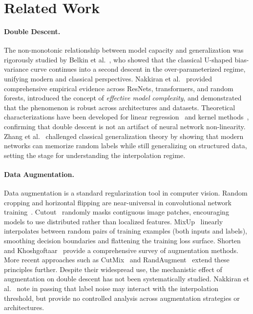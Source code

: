 \section{Related Work}

\paragraph{Double Descent.}
The non-monotonic relationship between model capacity and generalization was rigorously studied by Belkin et al.~\cite{belkin2019reconciling}, who showed that the classical U-shaped bias-variance curve continues into a second descent in the over-parameterized regime, unifying modern and classical perspectives. Nakkiran et al.~\cite{nakkiran2020deep} provided comprehensive empirical evidence across ResNets, transformers, and random forests, introduced the concept of \emph{effective model complexity}, and demonstrated that the phenomenon is robust across architectures and datasets. Theoretical characterizations have been developed for linear regression~\cite{bartlett2020benign} and kernel methods~\cite{mei2022generalization}, confirming that double descent is not an artifact of neural network non-linearity. Zhang et al.~\cite{zhang2017understanding} challenged classical generalization theory by showing that modern networks can memorize random labels while still generalizing on structured data, setting the stage for understanding the interpolation regime.

\paragraph{Data Augmentation.}
Data augmentation is a standard regularization tool in computer vision. Random cropping and horizontal flipping are near-universal in convolutional network training~\cite{he2016deep,krizhevsky2009learning}. Cutout~\cite{devries2017cutout} randomly masks contiguous image patches, encouraging models to use distributed rather than localized features. MixUp~\cite{zhang2018mixup} linearly interpolates between random pairs of training examples (both inputs and labels), smoothing decision boundaries and flattening the training loss surface. Shorten and Khoshgoftaar~\cite{shorten2019survey} provide a comprehensive survey of augmentation methods. More recent approaches such as CutMix~\cite{yun2019cutmix} and RandAugment~\cite{cubuk2020randaugment} extend these principles further. Despite their widespread use, the mechanistic effect of augmentation on double descent has not been systematically studied. Nakkiran et al.~\cite{nakkiran2020deep} note in passing that label noise may interact with the interpolation threshold, but provide no controlled analysis across augmentation strategies or architectures.

